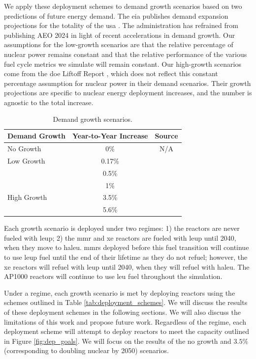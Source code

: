 We apply these deployment schemes to demand growth scenarios based on two
predictions of future energy demand. The \gls{eia} publishes demand expansion
projections for the totality of the \gls{usa} \cite{eia_aeo_2023}. The
administration has refrained from publishing AEO 2024 in light of recent
accelerations in demand growth. Our assumptions for the low-growth scenarios
are that the relative percentage of nuclear power remains constant and that the
relative performance of the various fuel cycle metrics we simulate will remain
constant. Our high-growth scenarios come from the \gls{doe} Liftoff Report
\cite{julie_liftoff_pathways_2024}, which does not reflect this constant
percentage assumption for nuclear power in their demand scenarios. Their growth
projections are specific to nuclear energy deployment increases, and the number is agnostic to the total increase.

\begin{table}[H]
    \centering
    \caption{Demand growth scenarios.}
    \label{tab:demand_scenarios}
    \begin{tabular}{l c c}
        \hline
        \textbf{Demand Growth} & \textbf{Year-to-Year Increase} & \textbf{Source}\\
        \hline
        No Growth & 0\% & N/A\\
        Low Growth & 0.17\% & \cite{eia_aeo_2023}\\
         & 0.5\% & \cite{eia_aeo_2023}\\
         & 1\% & \cite{eia_aeo_2023}\\
        High Growth & 3.5\% & \cite{julie_liftoff_pathways_2024} \\
         & 5.6\% & \cite{julie_liftoff_pathways_2024}\\
        \hline
    \end{tabular}
  \end{table}

Each growth scenario is deployed under two regimes: 1) the reactors are never
fueled with \gls{leup}; 2) the \gls{mmr} and \gls{xe} reactors are fueled with
\gls{leup} until 2040, when they move to \gls{haleu}. \glspl{mmr} deployed
before this fuel transition will continue to use \gls{leup} fuel until the end
of their lifetime as they do not refuel; however, the \gls{xe} reactors will
refuel with \gls{leup} until 2040, when they will refuel with \gls{haleu}. The
AP1000 reactors will continue to use \gls{leu} fuel throughout the simulation.

Under a regime, each growth scenario is met by deploying reactors using the
schemes outlined in Table \ref{tab:deployment_schemes}. We will discuss the
results of these deployment schemes in the following sections. We will also
discuss the limitations of this work and propose future work. Regardless of the
regime, each deployment scheme will attempt to deploy reactors to meet the
capacity outlined in Figure \ref{fig:dep_goals}. We will focus on the results
of the no growth and $3.5\%$ (corresponding to doubling nuclear by 2050)
scenarios.

